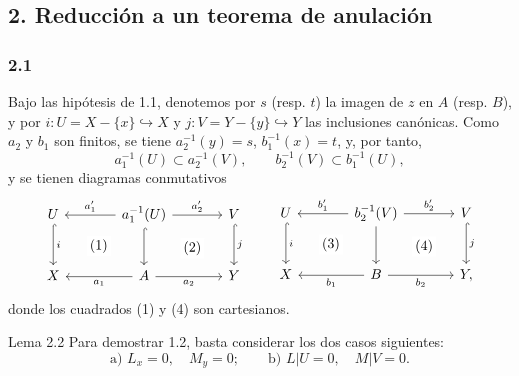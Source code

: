\subsection*{2. Reducción a un teorema de anulación}

\subsubsection*{2.1}
Bajo las hipótesis de 1.1, denotemos por $s$ (resp. $t$) la imagen de $z$ en $A$ (resp. $B$), y por $i:U=X-\{x\}\hookrightarrow X$ y $j:V=Y-\{y\}\hookrightarrow Y$ las inclusiones canónicas. Como $a_2$ y $b_1$ son finitos, se tiene $a_2^{-1}(y)=s$, $b_1^{-1}(x)=t$, y, por tanto,
\[
a_1^{-1}(U)\subset a_2^{-1}(V),\qquad b_2^{-1}(V)\subset b_1^{-1}(U),
\]
y se tienen diagramas conmutativos
\[
\begin{tikzcd}[column sep=large,row sep=large]
U \arrow[d,hook,"i"] \arrow[rd,phantom,"(1)"{description}] & a_1^{-1}(U) \arrow[l,"a'_1"'] \arrow[r,"a'_2"] \arrow[d,hook] \arrow[rd,phantom,"(2)"{description}] & V \arrow[d,hook,"j"]\\
X & A \arrow[l,"a_1"] \arrow[r,"a_2"'] & Y
\end{tikzcd}
\qquad
\begin{tikzcd}[column sep=large,row sep=large]
U \arrow[d,hook,"i"] \arrow[rd,phantom,"(3)"{description}] & b_2^{-1}(V) \arrow[l,"b'_1"'] \arrow[r,"b'_2"] \arrow[d] \arrow[rd,phantom,"(4)"{description}] & V \arrow[d,hook,"j"]\\
X & B \arrow[l,"b_1"] \arrow[r,"b_2"'] & Y ,
\end{tikzcd}
\]
donde los cuadrados (1) y (4) son cartesianos.

\begin{statement}{Lema 2.2}
Para demostrar 1.2, basta considerar los dos casos siguientes:
\[
\text{a) } L_x=0,\quad M_y=0;\qquad
\text{b) } L|U=0,\quad M|V=0 .
\]
\end{statement}

